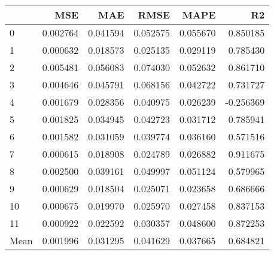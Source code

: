 \begin{tabular}{lrrrrr}
\toprule
 & MSE & MAE & RMSE & MAPE & R2 \\
\midrule
0 & 0.002764 & 0.041594 & 0.052575 & 0.055670 & 0.850185 \\
1 & 0.000632 & 0.018573 & 0.025135 & 0.029119 & 0.785430 \\
2 & 0.005481 & 0.056083 & 0.074030 & 0.052632 & 0.861710 \\
3 & 0.004646 & 0.045791 & 0.068156 & 0.042722 & 0.731727 \\
4 & 0.001679 & 0.028356 & 0.040975 & 0.026239 & -0.256369 \\
5 & 0.001825 & 0.034945 & 0.042723 & 0.031712 & 0.785941 \\
6 & 0.001582 & 0.031059 & 0.039774 & 0.036160 & 0.571516 \\
7 & 0.000615 & 0.018908 & 0.024789 & 0.026882 & 0.911675 \\
8 & 0.002500 & 0.039161 & 0.049997 & 0.051124 & 0.579965 \\
9 & 0.000629 & 0.018504 & 0.025071 & 0.023658 & 0.686666 \\
10 & 0.000675 & 0.019970 & 0.025970 & 0.027458 & 0.837153 \\
11 & 0.000922 & 0.022592 & 0.030357 & 0.048600 & 0.872253 \\
Mean & 0.001996 & 0.031295 & 0.041629 & 0.037665 & 0.684821 \\
\bottomrule
\end{tabular}
